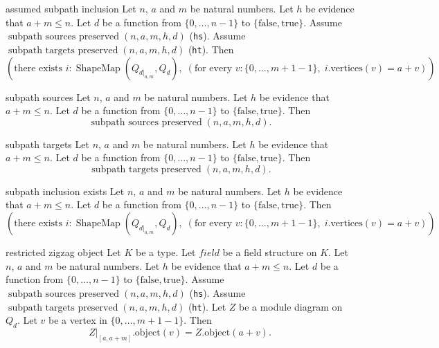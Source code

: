 \begin{cleanresult}{assumed subpath inclusion}
Let $n$, $a$ and $m$ be natural numbers.
Let $h$ be evidence that $a+m\le n$.
Let $d$ be a function from $\{0,\ldots,n-1\}$ to $\{\mathrm{false},\mathrm{true}\}$.
Assume $\operatorname{subpath\ sources\ preserved}(n, a, m, h, d)$ (\texttt{hs}).
Assume $\operatorname{subpath\ targets\ preserved}(n, a, m, h, d)$ (\texttt{ht}).
Then \[\left(\text{there exists }i : \operatorname{ShapeMap}(Q_{d|_{a,m}},Q_{d}),\; \left(\text{for every }v : \{0,\ldots,m+1-1\},\; i.\mathrm{vertices}(v)=a+v\right)\right).\]
\end{cleanresult}

\begin{cleanresult}{subpath sources}
Let $n$, $a$ and $m$ be natural numbers.
Let $h$ be evidence that $a+m\le n$.
Let $d$ be a function from $\{0,\ldots,n-1\}$ to $\{\mathrm{false},\mathrm{true}\}$.
Then \[\operatorname{subpath\ sources\ preserved}(n, a, m, h, d).\]
\end{cleanresult}

\begin{cleanresult}{subpath targets}
Let $n$, $a$ and $m$ be natural numbers.
Let $h$ be evidence that $a+m\le n$.
Let $d$ be a function from $\{0,\ldots,n-1\}$ to $\{\mathrm{false},\mathrm{true}\}$.
Then \[\operatorname{subpath\ targets\ preserved}(n, a, m, h, d).\]
\end{cleanresult}

\begin{cleanresult}{subpath inclusion exists}
Let $n$, $a$ and $m$ be natural numbers.
Let $h$ be evidence that $a+m\le n$.
Let $d$ be a function from $\{0,\ldots,n-1\}$ to $\{\mathrm{false},\mathrm{true}\}$.
Then \[\left(\text{there exists }i : \operatorname{ShapeMap}(Q_{d|_{a,m}},Q_{d}),\; \left(\text{for every }v : \{0,\ldots,m+1-1\},\; i.\mathrm{vertices}(v)=a+v\right)\right).\]
\end{cleanresult}

\begin{cleanresult}{restricted zigzag object}
Let $K$ be a type.
Let $\mathit{field}$ be a field structure on $K$.
Let $n$, $a$ and $m$ be natural numbers.
Let $h$ be evidence that $a+m\le n$.
Let $d$ be a function from $\{0,\ldots,n-1\}$ to $\{\mathrm{false},\mathrm{true}\}$.
Assume $\operatorname{subpath\ sources\ preserved}(n, a, m, h, d)$ (\texttt{hs}).
Assume $\operatorname{subpath\ targets\ preserved}(n, a, m, h, d)$ (\texttt{ht}).
Let $Z$ be a module diagram on $Q_{d}$.
Let $v$ be a vertex in $\{0,\ldots,m+1-1\}$.
Then \[Z|_{[a,a+m]}.\mathrm{object}(v)=Z.\mathrm{object}(a+v).\]
\end{cleanresult}

